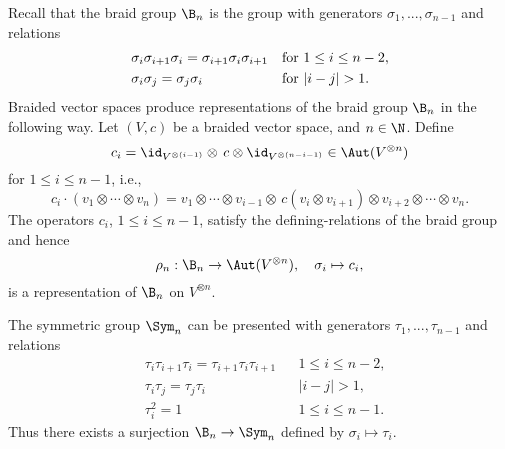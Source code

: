 %
Recall that the braid group $\B_n$ is the group with generators
$\sigma_{1},...,\sigma_{n-1}$ and relations
\begin{align*}
	&\sigma_{i}\sigma_{i+1}\sigma_{i}=\sigma_{i+1}\sigma_{i}\sigma_{i+1} && \text{for }1\leq i\leq n-2,\\
	&\sigma_{i}\sigma_{j}=\sigma_{j}\sigma_{i} && \text{for \ensuremath{|i-j|>1}.}
\end{align*}
Braided vector spaces produce representations of the braid group  $\B_n$ in the following way. 
Let $(V,c)$ be a braided vector space, and $n\in\N$. Define
\[
c_{i}=\id_{V^{\otimes(i-1)}}\otimes\, c\otimes\id_{V^{\otimes(n-i-1)}}\in\Aut(V^{\otimes n})
\]
for $1\leq i\leq n-1$, i.e.,
\[
c_{i}\cdot(v_{1}\otimes\cdots\otimes v_{n})=v_{1}\otimes\cdots\otimes v_{i-1}\otimes\, c(v_{i}\otimes v_{i+1})\otimes v_{i+2}\otimes\cdots\otimes v_{n}.
\]
The operators $c_{i}$, $1\leq i\leq n-1$, satisfy the defining-relations of the
braid group and hence 
\[
	\rho_{n}:\B_{n}\to\Aut(V^{\otimes n}),
	\quad
	\sigma_i\mapsto c_i,
\]
is a representation of $\B_{n}$ on $V^{\otimes n}$.

The symmetric group $\Sym_{n}$ can be presented with generators 
$\tau_{1},...,\tau_{n-1}$ and relations
\begin{align*}
	&\tau_{i}\tau_{i+1}\tau_{i}=\tau_{i+1}\tau_{i}\tau_{i+1} &  & 1\leq i\leq n-2,\\
	&\tau_{i}\tau_{j}=\tau_{j}\tau_{i} &  & \ensuremath{|i-j|>1},\\
	&\tau_{i}^{2}=1 &  & 1\leq i\leq n-1.
\end{align*}
Thus there exists a surjection $\B_{n}\to\Sym_{n}$ defined by
$\sigma_{i}\mapsto\tau_{i}$. 


